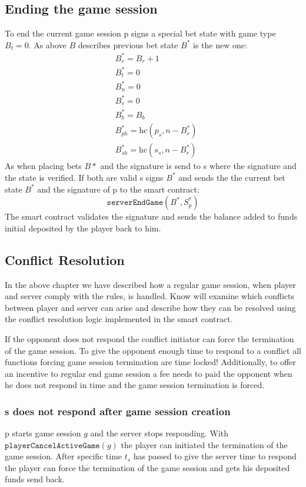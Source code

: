 \documentclass[oneside]{amsart}
\begin{document}
\begin{multicols}{2}
\subsection{Ending the game session}\label{subsec:endGameSession}
To end the current game session \gls{p} signs a special bet state with game type $B_t = 0$.
As above $B$ describes
previous bet state $B^*$ is the new one:
\begin{align}
    &B^*_r = B_r + 1 \\
    &B^*_t = 0 \\
    &B^*_n = 0 \\
    &B^*_v = 0 \\
    &B^*_b = B_b  \\
    &B^*_{ph} = \text{hc}(p_s, n - B^*_r) \\
    &B^*_{sh} = \text{hc}(s_s, n - B^*_r)
\end{align}
As when placing bets $B*$ and the signature is send to \gls{s} where the signature and the state is verified.
If both are valid \gls{s} signs $B^*$ and sends the the current bet state  $B^*$ and the signature of
\gls{p} to the smart contract:
\begin{equation}
    \texttt{serverEndGame}(B^*, S_p^*)
\end{equation}
The smart contract validates the signature and sends the balance added to funds initial deposited by the player back to him.

\subsection{Conflict Resolution}\label{subsec:conflictResolution}
In the above chapter we have described how a regular game session, when player and server comply with the rules, is handled.
Know will examine which conflicts between player and server can arise and describe how
they can be resolved using the conflict resolution logic implemented in the smart contract.

If the opponent does not respond the conflict initiator can force the termination of the game session.
To give the opponent enough time to respond to a conflict all functions forcing game session termination are
time locked!
Additionally, to offer an incentive to regular end game session a fee needs to paid the opponent when he does not respond in time and
the game session termination is forced.

\subsubsection{\Gls{s} does not respond after game session creation}
\Gls{p} starts game session $g$ and the server stops responding.
With $\texttt{playerCancelActiveGame}(g)$ the player can initiated the termination of the game session.
After specific time $t_s$ has passed to give the server time to respond the player can force the termination
of the game session and gets his deposited funds send back.


\end{multicols}
\end{document}
